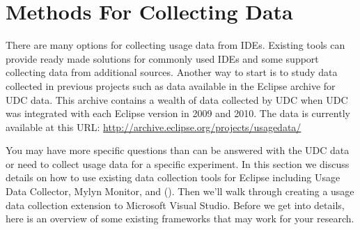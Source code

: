 \section{Methods For Collecting Data}
\label{SecHowToCollectData}

There are many options for collecting usage data from IDEs.   Existing tools can provide ready made solutions for commonly used IDEs and some support collecting data from additional sources.   Another way to start is to study data collected in previous projects such as data available in the Eclipse archive for UDC data.  This archive contains a wealth of data collected by UDC when UDC was integrated with each Eclipse version in 2009 and 2010.  The data is currently available at this URL:
\url{http://archive.eclipse.org/projects/usagedata/}

You may have more specific questions than can be answered with the UDC data or need to collect usage data for a specific experiment.  In this section we discuss details on how to use existing data collection tools for Eclipse including Usage Data Collector, Mylyn Monitor, and \CodingSpectator{} ().  Then we'll walk through creating a usage data collection extension to Microsoft Visual Studio.  Before we get into details, here is an overview of some existing frameworks that may work for your research.

